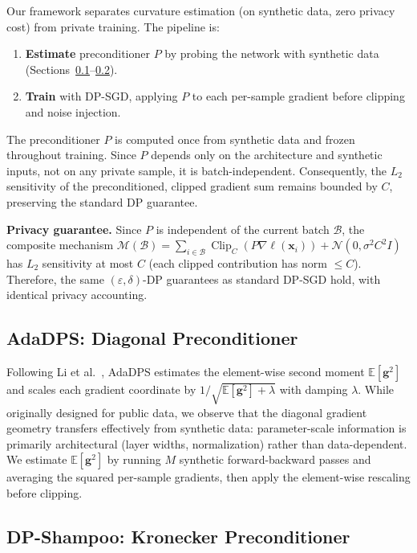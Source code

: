 \documentclass[runningheads]{llncs}
\newcommand{\E}{\mathbb{E}}
\newcommand{\bx}{\mathbf{x}}
\newcommand{\bg}{\mathbf{g}}
\DeclareMathOperator{\Clip}{Clip}
\begin{document}
Our framework separates curvature estimation (on synthetic data, zero privacy cost) from private training. The pipeline is:
\begin{enumerate}
\item \textbf{Estimate} preconditioner $P$ by probing the network with synthetic data (Sections~\ref{subsec:adadps}--\ref{subsec:shampoo}).
\item \textbf{Train} with DP-SGD, applying $P$ to each per-sample gradient before clipping and noise injection.
\end{enumerate}

The preconditioner $P$ is computed once from synthetic data and frozen throughout training. Since $P$ depends only on the architecture and synthetic inputs, not on any private sample, it is batch-independent. Consequently, the $L_2$ sensitivity of the preconditioned, clipped gradient sum remains bounded by $C$, preserving the standard DP guarantee.

\textbf{Privacy guarantee.}
Since $P$ is independent of the current batch $\mathcal{B}$, the composite mechanism $\mathcal{M}(\mathcal{B})=\sum_{i\in\mathcal{B}}\Clip_C(P\nabla\ell(\bx_i))+\mathcal{N}(0,\sigma^2 C^2 I)$ has $L_2$ sensitivity at most $C$ (each clipped contribution has norm $\leq C$). Therefore, the same $(\varepsilon,\delta)$-DP guarantees as standard DP-SGD hold, with identical privacy accounting.

\subsection{AdaDPS: Diagonal Preconditioner}
\label{subsec:adadps}

Following Li et al.~\cite{Li2022}, AdaDPS estimates the element-wise second moment $\E[\bg^2]$ and scales each gradient coordinate by $1/\sqrt{\E[\bg^2]+\lambda}$ with damping $\lambda$. While originally designed for public data, we observe that the diagonal gradient geometry transfers effectively from synthetic data: parameter-scale information is primarily architectural (layer widths, normalization) rather than data-dependent. We estimate $\E[\bg^2]$ by running $M$ synthetic forward-backward passes and averaging the squared per-sample gradients, then apply the element-wise rescaling before clipping.

\subsection{DP-Shampoo: Kronecker Preconditioner}
\label{subsec:shampoo}
\end{document}
